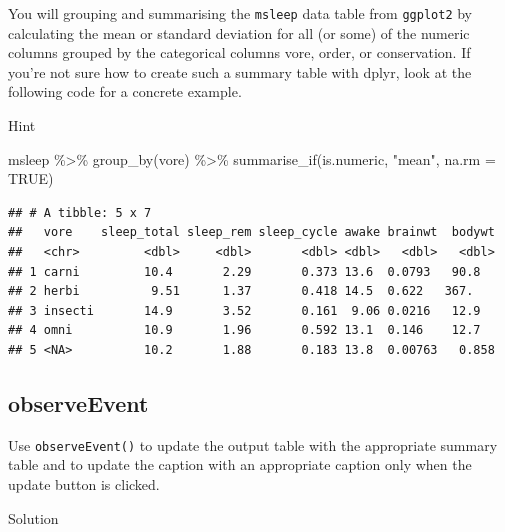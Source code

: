 \documentclass[
]{book}
\newenvironment{Shaded}{\begin{snugshade}}{\end{snugshade}}
\newcommand{\AttributeTok}[1]{\textcolor[rgb]{0.77,0.63,0.00}{#1}}
\newcommand{\ConstantTok}[1]{\textcolor[rgb]{0.00,0.00,0.00}{#1}}
\newcommand{\FunctionTok}[1]{\textcolor[rgb]{0.00,0.00,0.00}{#1}}
\newcommand{\NormalTok}[1]{#1}
\newcommand{\SpecialCharTok}[1]{\textcolor[rgb]{0.00,0.00,0.00}{#1}}
\newcommand{\StringTok}[1]{\textcolor[rgb]{0.31,0.60,0.02}{#1}}
\begin{document}
You will grouping and summarising the \texttt{msleep} data table from \texttt{ggplot2} by calculating the mean or standard deviation for all (or some) of the numeric columns grouped by the categorical columns vore, order, or conservation. If you're not sure how to create such a summary table with dplyr, look at the following code for a concrete example.

Hint

\begin{Shaded}
\begin{Highlighting}[]
\NormalTok{msleep }\SpecialCharTok{\%\textgreater{}\%}
  \FunctionTok{group\_by}\NormalTok{(vore) }\SpecialCharTok{\%\textgreater{}\%}
  \FunctionTok{summarise\_if}\NormalTok{(is.numeric, }\StringTok{"mean"}\NormalTok{, }\AttributeTok{na.rm =} \ConstantTok{TRUE}\NormalTok{)}
\end{Highlighting}
\end{Shaded}

\begin{verbatim}
## # A tibble: 5 x 7
##   vore    sleep_total sleep_rem sleep_cycle awake brainwt  bodywt
##   <chr>         <dbl>     <dbl>       <dbl> <dbl>   <dbl>   <dbl>
## 1 carni         10.4       2.29       0.373 13.6  0.0793   90.8  
## 2 herbi          9.51      1.37       0.418 14.5  0.622   367.   
## 3 insecti       14.9       3.52       0.161  9.06 0.0216   12.9  
## 4 omni          10.9       1.96       0.592 13.1  0.146    12.7  
## 5 <NA>          10.2       1.88       0.183 13.8  0.00763   0.858
\end{verbatim}

\hypertarget{observeevent-2}{%
\subsection{observeEvent}\label{observeevent-2}}

Use \texttt{observeEvent()} to update the output table with the appropriate summary table and to update the caption with an appropriate caption only when the update button is clicked.

Solution
\end{document}
